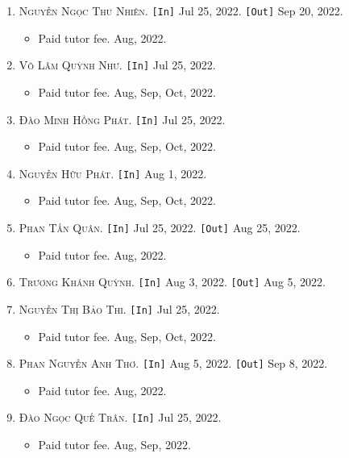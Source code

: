 \documentclass{article}
\numberwithin{equation}{section}
\begin{document}
\begin{enumerate}
	\item \textsc{Nguyễn Ngọc Thu Nhiên.} \texttt{[In]} Jul 25, 2022. \texttt{[Out]} Sep 20, 2022.
	\begin{itemize}
		\item \textsf{Paid tutor fee.} Aug, 2022.
	\end{itemize}
	\item \textsc{Võ Lâm Quỳnh Như.} \texttt{[In]} Jul 25, 2022.
	\begin{itemize}
		\item \textsf{Paid tutor fee.} Aug, Sep, Oct, 2022.
	\end{itemize}
	\item \textsc{Đào Minh Hồng Phát.} \texttt{[In]} Jul 25, 2022.
	\begin{itemize}
		\item \textsf{Paid tutor fee.} Aug, Sep, Oct, 2022.
	\end{itemize}
	\item \textsc{Nguyễn Hữu Phát.} \texttt{[In]} Aug 1, 2022.
	\begin{itemize}
		\item \textsf{Paid tutor fee.} Aug, Sep, Oct, 2022.
	\end{itemize}
	\item \textsc{Phan Tấn Quân.} \texttt{[In]} Jul 25, 2022. \texttt{[Out]} Aug 25, 2022.
	\begin{itemize}
		\item \textsf{Paid tutor fee.} Aug, 2022.
	\end{itemize}
	\item \textsc{Trương Khánh Quỳnh.} \texttt{[In]} Aug 3, 2022. \texttt{[Out]} Aug 5, 2022.
	\item \textsc{Nguyễn Thị Bảo Thi.} \texttt{[In]} Jul 25, 2022.
	\begin{itemize}
		\item \textsf{Paid tutor fee.} Aug, Sep, Oct, 2022.
	\end{itemize}
	\item \textsc{Phan Nguyễn Anh Thơ.} \texttt{[In]} Aug 5, 2022. \texttt{[Out]} Sep 8, 2022.
	\begin{itemize}
		\item \textsf{Paid tutor fee.} Aug, 2022.
	\end{itemize}
	\item \textsc{Đào Ngọc Quế Trân.} \texttt{[In]} Jul 25, 2022.
	\begin{itemize}
		\item \textsf{Paid tutor fee.} Aug, Sep, 2022.
	\end{itemize}

\end{enumerate}
\end{document}
